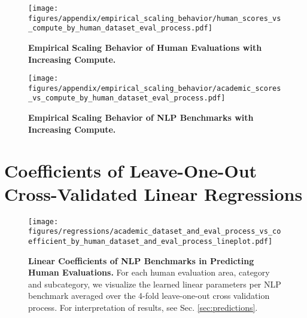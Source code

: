 \begin{figure}[h]
    \centering
    \texttt{[image: figures/appendix/empirical\_scaling\_behavior/human\_scores\_vs\_compute\_by\_human\_dataset\_eval\_process.pdf]}
    \caption{\textbf{Empirical Scaling Behavior of Human Evaluations with Increasing Compute.}}
    \label{app:fig:human_eval_vs_compute}
\end{figure}

\begin{figure}
    \centering
    \texttt{[image: figures/appendix/empirical\_scaling\_behavior/academic\_scores\_vs\_compute\_by\_human\_dataset\_eval\_process.pdf]}
    \caption{\textbf{Empirical Scaling Behavior of NLP Benchmarks with Increasing Compute.}}
    \label{app:fig:nlp_benchmark_vs_compute}
\end{figure}

\clearpage
\section{Coefficients of Leave-One-Out Cross-Validated Linear Regressions}

\begin{figure}[h!]
    \centering
    \texttt{[image: figures/regressions/academic\_dataset\_and\_eval\_process\_vs\_coefficient\_by\_human\_dataset\_and\_eval\_process\_lineplot.pdf]}
    \caption{\textbf{Linear Coefficients of NLP Benchmarks in Predicting Human Evaluations.} For each human evaluation area, category and subcategory, we visualize the learned linear parameters per NLP benchmark averaged over the 4-fold leave-one-out cross validation process. For interpretation of results, see Sec. \ref{sec:predictions}.}
    \label{app:fig:linear_regression_coefficients}
\end{figure}
